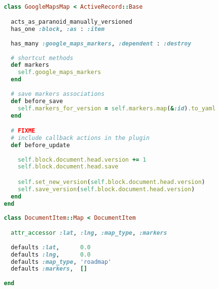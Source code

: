 \begin{lstlisting}[language=ruby, float=htb, label=src:block_before, caption=Original ``Map'' Block item.]

class GoogleMapsMap < ActiveRecord::Base

  acts_as_paranoid_manually_versioned
  has_one :block, :as : :item
  
  has_many :google_maps_markers, :dependent : :destroy
  
  # shortcut methods
  def markers
    self.google_maps_markers
  end
  
  # save markers associations
  def before_save
    self.markers_for_version = self.markers.map(&:id).to_yaml
  end

  # FIXME
  # include callback actions in the plugin
  def before_update
  
    self.block.document.head.version += 1
    self.block.document.head.save

    self.set_new_version(self.block.document.head.version)
    self.save_version(self.block.document.head.version)
  end
end
\end{lstlisting}

\begin{lstlisting}[language=ruby, float=htb, label=src:block_after, caption=Refactored ``Map'' Block item.]
class DocumentItem::Map < DocumentItem

  attr_accessor :lat, :lng, :map_type, :markers
  
  defaults :lat,      0.0
  defaults :lng,      0.0
  defaults :map_type, 'roadmap'
  defaults :markers,  []
  
end
\end{lstlisting}
